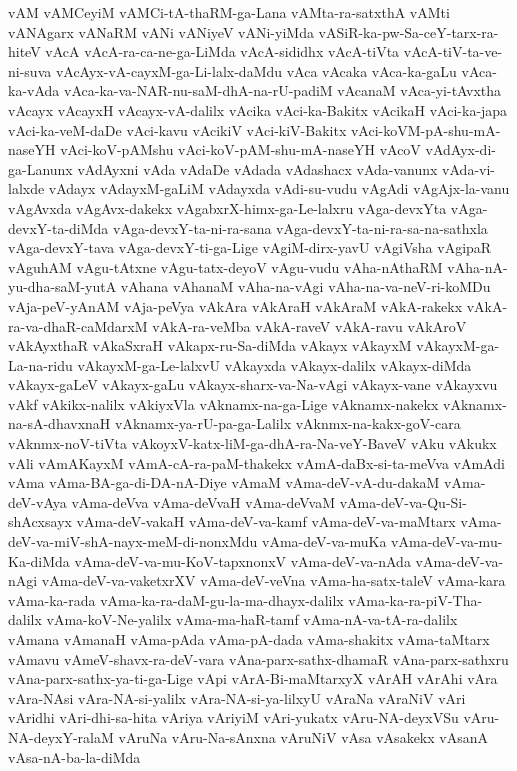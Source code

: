 {vAM
vAMCeyiM
vAMCi-tA-thaRM-ga-Lana
vAMta-ra-satxthA
vAMti
vANAgarx
vANaRM
vANi
vANiyeV
vANi-yiMda
vASiR-ka-pw-Sa-ceY-tarx-ra-hiteV
vAcA
vAcA-ra-ca-ne-ga-LiMda
vAcA-sididhx
vAcA-tiVta
vAcA-tiV-ta-ve-ni-suva
vAcAyx-vA-cayxM-ga-Li-lalx-daMdu
vAca
vAcaka
vAca-ka-gaLu
vAca-ka-vAda
vAca-ka-va-NAR-nu-saM-dhA-na-rU-padiM
vAcanaM
vAca-yi-tAvxtha
vAcayx
vAcayxH
vAcayx-vA-dalilx
vAcika
vAci-ka-Bakitx
vAcikaH
vAci-ka-japa
vAci-ka-veM-daDe
vAci-kavu
vAcikiV
vAci-kiV-Bakitx
vAci-koVM-pA-shu-mA-naseYH
vAci-koV-pAMshu
vAci-koV-pAM-shu-mA-naseYH
vAcoV
vAdAyx-di-ga-Lanunx
vAdAyxni
vAda
vAdaDe
vAdada
vAdashacx
vAda-vanunx
vAda-vi-lalxde
vAdayx
vAdayxM-gaLiM
vAdayxda
vAdi-su-vudu
vAgAdi
vAgAjx-la-vanu
vAgAvxda
vAgAvx-dakekx
vAgabxrX-himx-ga-Le-lalxru
vAga-devxYta
vAga-devxY-ta-diMda
vAga-devxY-ta-ni-ra-sana
vAga-devxY-ta-ni-ra-sa-na-sathxla
vAga-devxY-tava
vAga-devxY-ti-ga-Lige
vAgiM-dirx-yavU
vAgiVsha
vAgipaR
vAguhAM
vAgu-tAtxne
vAgu-tatx-deyoV
vAgu-vudu
vAha-nAthaRM
vAha-nA-yu-dha-saM-yutA
vAhana
vAhanaM
vAha-na-vAgi
vAha-na-va-neV-ri-koMDu
vAja-peV-yAnAM
vAja-peVya
vAkAra
vAkAraH
vAkAraM
vAkA-rakekx
vAkA-ra-va-dhaR-caMdarxM
vAkA-ra-veMba
vAkA-raveV
vAkA-ravu
vAkAroV
vAkAyxthaR
vAkaSxraH
vAkapx-ru-Sa-diMda
vAkayx
vAkayxM
vAkayxM-ga-La-na-ridu
vAkayxM-ga-Le-lalxvU
vAkayxda
vAkayx-dalilx
vAkayx-diMda
vAkayx-gaLeV
vAkayx-gaLu
vAkayx-sharx-va-Na-vAgi
vAkayx-vane
vAkayxvu
vAkf
vAkikx-nalilx
vAkiyxVla
vAknamx-na-ga-Lige
vAknamx-nakekx
vAknamx-na-sA-dhavxnaH
vAknamx-ya-rU-pa-ga-Lalilx
vAknmx-na-kakx-goV-cara
vAknmx-noV-tiVta
vAkoyxV-katx-liM-ga-dhA-ra-Na-veY-BaveV
vAku
vAkukx
vAli
vAmAKayxM
vAmA-cA-ra-paM-thakekx
vAmA-daBx-si-ta-meVva
vAmAdi
vAma
vAma-BA-ga-di-DA-nA-Diye
vAmaM
vAma-deV-vA-du-dakaM
vAma-deV-vAya
vAma-deVva
vAma-deVvaH
vAma-deVvaM
vAma-deV-va-Qu-Si-shAcxsayx
vAma-deV-vakaH
vAma-deV-va-kamf
vAma-deV-va-maMtarx
vAma-deV-va-miV-shA-nayx-meM-di-nonxMdu
vAma-deV-va-muKa
vAma-deV-va-mu-Ka-diMda
vAma-deV-va-mu-KoV-tapxnonxV
vAma-deV-va-nAda
vAma-deV-va-nAgi
vAma-deV-va-vaketxrXV
vAma-deV-veVna
vAma-ha-satx-taleV
vAma-kara
vAma-ka-rada
vAma-ka-ra-daM-gu-la-ma-dhayx-dalilx
vAma-ka-ra-piV-Tha-dalilx
vAma-koV-Ne-yalilx
vAma-ma-haR-tamf
vAma-nA-va-tA-ra-dalilx
vAmana
vAmanaH
vAma-pAda
vAma-pA-dada
vAma-shakitx
vAma-taMtarx
vAmavu
vAmeV-shavx-ra-deV-vara
vAna-parx-sathx-dhamaR
vAna-parx-sathxru
vAna-parx-sathx-ya-ti-ga-Lige
vApi
vArA-Bi-maMtarxyX
vArAH
vArAhi
vAra
vAra-NAsi
vAra-NA-si-yalilx
vAra-NA-si-ya-lilxyU
vAraNa
vAraNiV
vAri
vAridhi
vAri-dhi-sa-hita
vAriya
vAriyiM
vAri-yukatx
vAru-NA-deyxVSu
vAru-NA-deyxY-ralaM
vAruNa
vAru-Na-sAnxna
vAruNiV
vAsa
vAsakekx
vAsanA
vAsa-nA-ba-la-diMda
}
